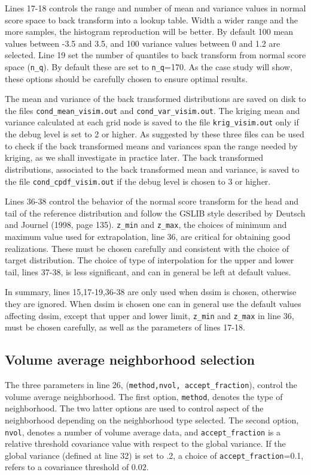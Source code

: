 \documentclass[12t]{article}
\begin{document}
Lines 17-18 controls the range and number of mean and variance values
in normal score space to back transform into a lookup table. Width a
wider range and the more samples, the histogram reproduction will be
better.
By default 100 mean values between -3.5 and 3.5, and 100 variance
values between 0 and 1.2 are selected.
Line 19 set the number of quantiles to back transform from normal
score space (\texttt{n\_q}).
By default these are set to  \texttt{n\_q}=170.
As the case study will show, these options should be carefully chosen to ensure optimal results.

The mean and variance of the back transformed distributions are saved
on disk to the files \texttt{cond\_mean\_visim.out} and 
\texttt{cond\_var\_visim.out}.
The kriging mean and variance calculated at each grid node is
saved to the file 
\texttt{krig\_visim.out} only if the debug level is set to 2 or higher.
As suggested by \cite{Deutsch:2000:DSSIM-HR} these three files can be used to check if the back transformed
means and variances span the range needed by kriging, as we shall
investigate in practice later.
The back transformed distributions, associated to the back transformed
mean and variance, is saved to the file 
\texttt{cond\_cpdf\_visim.out}
if the debug level is chosen to 3 or higher.

Lines 36-38 control the behavior of the normal score transform for the
head and tail of the reference distribution and follow the GSLIB style described by Deutsch and Journel (1998, page 135).
\texttt{z\_min} and \texttt{z\_max}, the choices of minimum and
maximum value used for extrapolation, line 36, are critical for obtaining good
realizations. These must be chosen carefully and consistent with the choice of
target distribution.
The choice of type of interpolation for the upper and lower tail, lines
37-38, is less significant, and can in general be left at default
values.

In summary, lines 15,17-19,36-38 are only used when dssim is chosen,
otherwise they are ignored. When dssim is chosen one can in general
use the default values affecting dssim, except that upper and lower
limit, \texttt{z\_min} and \texttt{z\_max} in line 36, must be chosen
carefully, as well as the parameters of lines 17-18. 

\subsection{Volume average neighborhood selection} 
The three parameters in line 26, (\texttt{method,nvol,
  accept\_fraction}), control the volume average neighborhood. 
The first option, \texttt{method}, denotes the type of
neighborhood. The two latter options are used to control aspect of the
neighborhood depending on the neighborhood type selected. 
The second option, \texttt{nvol}, denotes a number of volume average
data, and \texttt{accept\_fraction} is a relative threshold covariance
value with respect to the global variance. If the global variance
(defined at line 32) is set to .2, a choice of  
\texttt{accept\_fraction}=0.1, refers to a covariance threshold of $0.02$. 
\end{document}
